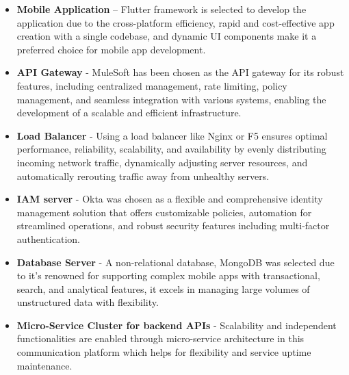 \begin{itemize}
    \item \textbf{Mobile Application} – Flutter framework is selected to develop the application due to the cross-platform efficiency, rapid and cost-effective app creation with a single codebase, and dynamic UI components make it a preferred choice for mobile app development. \cite{el2017taxonomy}
    \item \textbf{API Gateway} - MuleSoft has been chosen as the API gateway for its robust features, including centralized management, rate limiting, policy management, and seamless integration with various systems, enabling the development of a scalable and efficient infrastructure. \cite{zylstra2018extended}
    \item \textbf{Load Balancer} - Using a load balancer like Nginx or F5 ensures optimal performance, reliability, scalability, and availability by evenly distributing incoming network traffic, dynamically adjusting server resources, and automatically rerouting traffic away from unhealthy servers. \cite{tudor2009towards}
    \item \textbf{IAM server} - Okta was chosen as a flexible and comprehensive identity management solution that offers customizable policies, automation for streamlined operations, and robust security features including multi-factor authentication. \cite{fang2019okra} 
    \item \textbf{Database Server} - A non-relational database, MongoDB was selected due to it's renowned for supporting complex mobile apps with transactional, search, and analytical features, it excels in managing large volumes of unstructured data with flexibility.
    \item \textbf{Micro-Service Cluster for backend APIs} - Scalability and independent functionalities are enabled through micro-service architecture in this communication platform which helps for flexibility and service uptime maintenance.
\end{itemize}